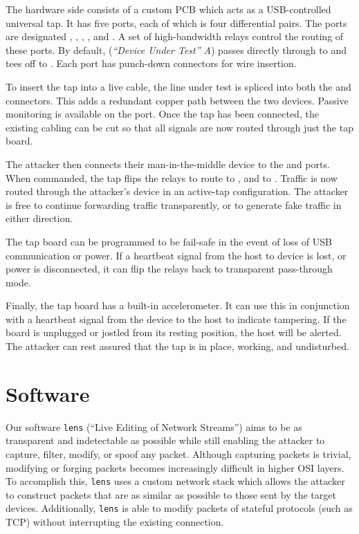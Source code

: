 \documentclass[12pt]{article}
\begin{document}
The hardware side consists of a custom PCB which acts as a USB-controlled universal tap. It has five ports, each of which is four differential pairs. The ports are designated , , , , and . A set of high-bandwidth relays control the routing of these ports. By default,  (\textit{``Device Under Test'' A}) passes directly through to  and tees off to .  Each port has punch-down connectors for wire insertion.

To insert the tap into a live cable, the line under test is spliced into both the  and  connectors. This adds a redundant copper path between the two devices. Passive monitoring is available on the  port. Once the tap has been connected, the existing cabling can be cut so that all signals are now routed through just the tap board.


The attacker then connects their man-in-the-middle device to the  and  ports. When commanded, the tap flips the relays to route  to , and  to . Traffic is now routed through the attacker’s device in an active-tap configuration. The attacker is free to continue forwarding traffic transparently, or to generate fake traffic in either direction.

The tap board can be programmed to be fail-safe in the event of loss of USB communication or power. If a heartbeat signal from the host to device is lost, or power is disconnected, it can flip the relays back to transparent pass-through mode.

Finally, the tap board has a built-in accelerometer. It can use this in conjunction with a heartbeat signal from the device to the host to indicate tampering. If the board is unplugged or jostled from its resting position, the host will be alerted. The attacker can rest assured that the tap is in place, working, and undisturbed.

\section{Software}
Our software \texttt{lens} (“Live Editing of Network Streams”) aims to be as transparent and indetectable as possible while still enabling the attacker to capture, filter, modify, or spoof any packet. Although capturing packets is trivial, modifying or forging packets becomes increasingly difficult in higher OSI layers. To accomplish this, \texttt{lens} uses a custom network stack which allows the attacker to construct packets that are as similar as possible to those sent by the target devices. Additionally, \texttt{lens} is able to modify packets of stateful protocols (such as TCP) without interrupting the existing connection.
    
\end{document}
